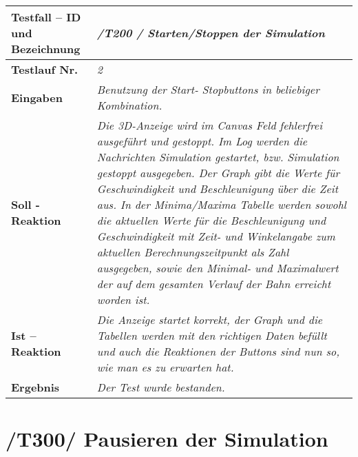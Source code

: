 \begin{longtable}{|p{7cm}|p{10cm}|}
\hline
\textbf{Testfall -- ID und Bezeichnung} & \textit{ /T200 / Starten/Stoppen der Simulation} \\
\hline
\textbf{Testlauf Nr.} & \textit{2} \\
\hline
\textbf{Eingaben} & \textit{Benutzung der Start- Stopbuttons in beliebiger Kombination.} \\
\hline
\textbf{Soll - Reaktion} & \textit{Die 3D-Anzeige wird im Canvas Feld fehlerfrei ausgeführt und gestoppt. Im Log werden die Nachrichten Simulation gestartet, bzw. Simulation gestoppt ausgegeben.
Der Graph gibt die Werte für Geschwindigkeit und Beschleunigung über die Zeit aus. In der Minima/Maxima Tabelle werden sowohl die aktuellen Werte für die Beschleunigung und Geschwindigkeit mit 
Zeit- und Winkelangabe zum aktuellen Berechnungszeitpunkt als Zahl ausgegeben, sowie den Minimal- und Maximalwert der auf dem gesamten Verlauf der Bahn erreicht worden ist.
} \\
\hline
\textbf{Ist -- Reaktion} & \textit{Die Anzeige startet korrekt, der Graph und die Tabellen werden mit den richtigen Daten befüllt und auch die Reaktionen der Buttons sind nun so, wie man es zu
erwarten hat.} \\
\hline
\textbf{Ergebnis} & \textit{Der Test wurde bestanden.} \\
\hline
\end{longtable}

\section{/T300/ Pausieren der Simulation}

